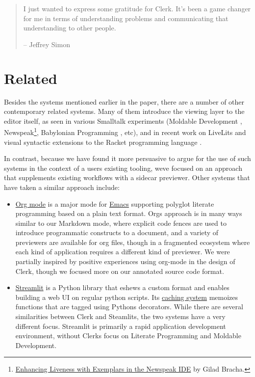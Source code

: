 \documentclass[sigconf,screen]{acmart}
\begin{document}
\begin{quote}
I just wanted to express some gratitude for Clerk. It's been a game changer for me in terms of understanding problems and communicating that understanding to other people.

-- Jeffrey Simon
\end{quote}

\hypertarget{related}{%
\section{Related}\label{related}}

Besides the systems mentioned earlier in the paper, there are a number of other contemporary related systems. Many of them introduce the viewing layer to the editor itself, as seen in various Smalltalk experiments (Moldable Development \cite{Chi__2015},  Newspeak\footnote{\href{https://newspeaklanguage.org/pubs/newspeak-exemplars.pdf}{Enhancing Liveness with Exemplars in the Newspeak IDE} by Gilad Bracha.},  Babylonian Programming \cite{Rauch_2019}, etc), and in recent work on LiveLits \cite{Omar_2021} and visual syntactic extensions to the Racket programming language \cite{Andersen_2020}.

In contrast, because we have found it more persuasive to argue for the use of such systems in the context of a user\textquotesingle s existing tooling, we\textquotesingle ve focused on an approach that supplements existing workflows with a sidecar previewer. Other systems that have taken a similar approach include:

\begin{itemize}
\item
  \href{https://orgmode.org}{Org mode} is a major mode for \href{https://www.gnu.org/software/emacs/}{Emacs} supporting polyglot literate programming based on a plain text format. Org\textquotesingle s approach is in many ways similar to our Markdown mode, where explicit code fences are used to introduce programmatic constructs to a document, and a variety of previewers are available for org files, though in a fragmented ecosystem where each kind of application requires a different kind of previewer. We were partially inspired by positive experiences using org-mode in the design of Clerk, though we focused more on our annotated source code format.
\item
  \href{https://streamlit.io}{Streamlit} is a Python library that eshews a custom format and enables building a web UI on regular python scripts. Its \href{https://docs.streamlit.io/library/get-started/main-concepts\#caching}{caching system} memoizes functions that are tagged using Python\textquotesingle s decorators. While there are several similarities between Clerk and Steamlits, the two systems have a very different focus. Streamlit is primarily a rapid application development environment, without Clerk\textquotesingle s focus on Literate Programming and Moldable Development.
\end{itemize}
\end{document}
